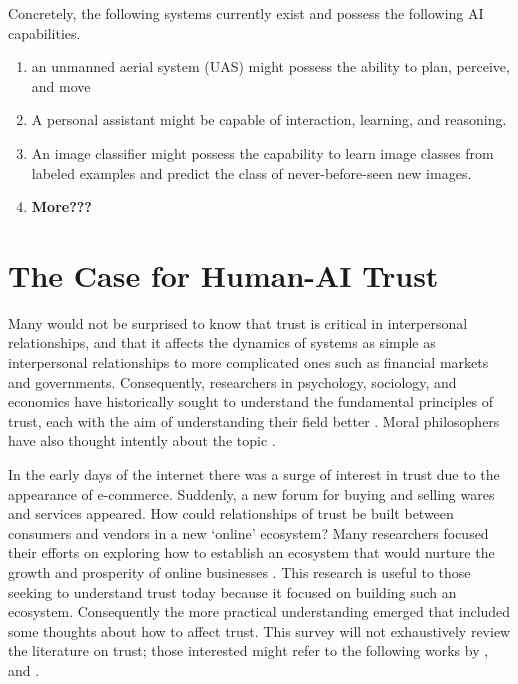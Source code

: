     Concretely, the following systems currently exist and possess the following AI capabilities.
    
    \begin{enumerate}
         \item an unmanned aerial system (UAS) might possess the ability to plan, perceive, and move
         \item A personal assistant might be capable of interaction, learning, and reasoning.
         \item An image classifier might possess the capability to learn image classes from labeled examples and predict the class of never-before-seen new images.
         \item \textbf{More???}
     \end{enumerate}
    

\section{The Case for Human-AI Trust}
    Many would not be surprised to know that trust is critical in interpersonal relationships, and that it affects the dynamics of systems as simple as interpersonal relationships to more complicated ones such as financial markets \cite{Fukuyama1995-un} and governments. Consequently, researchers in psychology, sociology, and economics have historically sought to understand the fundamental principles of trust, each with the aim of understanding their field better \cite{Gambetta1988-pi}. Moral philosophers have also thought intently about the topic \cite{Baier1986-im}.

    In the early days of the internet there was a surge of interest in trust due to the appearance of e-commerce. Suddenly, a new forum for buying and selling wares and services appeared. How could relationships of trust be built between consumers and vendors in a new `online' ecosystem? Many researchers focused their efforts on exploring how to establish an ecosystem that would nurture the growth and prosperity of online businesses \cite{McKnight2001-fa}. This research is useful to those seeking to understand trust today because it focused on building such an ecosystem. Consequently the more practical understanding emerged that included some thoughts about how to affect trust. This survey will not exhaustively review the literature on trust; those interested might refer to the following works by \citet{McKnight2001-fa}, and \citet{Lewicki2006-hj}.

